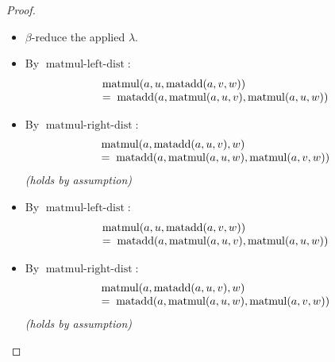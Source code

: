 \documentclass[11pt]{article}
\theoremstyle{plain}
\begin{document}
\begin{proof}
\begin{itemize}[leftmargin=2.8em, itemsep=4pt, parsep=1pt]
  \item[\textbf{112}] $\beta$-reduce the applied $\lambda$.
  \item[\textbf{113--115}] By $\operatorname{matmul\text{-}left\text{-}dist}$:
\begin{equation*}
\begin{array}{@{}l@{}} \operatorname{matmul}(a, u, \operatorname{matadd}(a, v, w)) \\ =\; \operatorname{matadd}(a, \operatorname{matmul}(a, u, v), \operatorname{matmul}(a, u, w)) \end{array}
\end{equation*}

  \item[\textbf{116--117}] By $\operatorname{matmul\text{-}right\text{-}dist}$:
\begin{equation*}
\begin{array}{@{}l@{}} \operatorname{matmul}(a, \operatorname{matadd}(a, u, v), w) \\ =\; \operatorname{matadd}(a, \operatorname{matmul}(a, u, w), \operatorname{matmul}(a, v, w)) \end{array}
\end{equation*}
  \emph{(holds by assumption)}
  \item[\textbf{118}] By $\operatorname{matmul\text{-}left\text{-}dist}$:
\begin{equation*}
\begin{array}{@{}l@{}} \operatorname{matmul}(a, u, \operatorname{matadd}(a, v, w)) \\ =\; \operatorname{matadd}(a, \operatorname{matmul}(a, u, v), \operatorname{matmul}(a, u, w)) \end{array}
\end{equation*}

  \item[\textbf{119--120}] By $\operatorname{matmul\text{-}right\text{-}dist}$:
\begin{equation*}
\begin{array}{@{}l@{}} \operatorname{matmul}(a, \operatorname{matadd}(a, u, v), w) \\ =\; \operatorname{matadd}(a, \operatorname{matmul}(a, u, w), \operatorname{matmul}(a, v, w)) \end{array}
\end{equation*}
  \emph{(holds by assumption)}
\end{itemize}
\end{proof}
\end{document}
